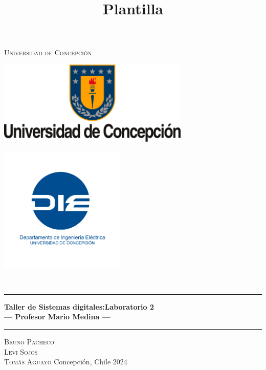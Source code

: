 \title{{\Large \\ Plantilla \\[0.1 cm]}}

\pagestyle{fancy}
\fancyhf{}
\lhead{\thetitle}
\cfoot{\thepage}

\begin{titlepage}
    \newcommand{\drop}{0.1\textheight}
    \newcommand{\halfdrop}{0.05\textheight}
    \vspace*{\drop}
    \begin{center}
    {\LARGE\textsc{Universidad de Concepción}}\\[\drop]
    \begin{minipage}{0.47\linewidth}
        \centering
        {\includegraphics[height=4cm]{extras/logo_udec.png}}
    \end{minipage}
    \begin{minipage}{0.47\linewidth}  %
        \centering
        {\includegraphics[height=6cm]{extras/logo_die.png}}
    \end{minipage}\\[\halfdrop]
    \rule{\textwidth}{1pt}\par
    \vspace{0.5\baselineskip}
    {\huge\bfseries Taller de Sistemas digitales:Laboratorio 2\\
    \large --- Profesor Mario Medina ---}\\[0.5\baselineskip]
    \rule{\textwidth}{1pt}\par
    \vfill
    {\Large\textsc{Bruno Pacheco \\ Levi Sojos \\[1ex] Tomás Aguayo}}
    \vfill
    Concepción, Chile
    \vfill
    {\large 2024}
    \end{center}
\end{titlepage}

\fancyfoot[C]{\thepage}  %
\renewcommand{\footrulewidth}{0.4pt}
